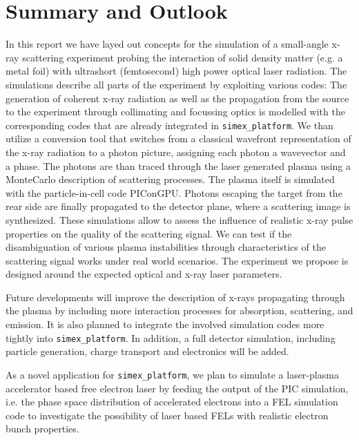 \documentclass[12pt]{scrartcl}
\begin{document}
\section{Summary and Outlook}
In this report we have layed out concepts for the simulation of a small-angle
x-ray scattering experiment probing the interaction of solid density matter
(e.g. a metal foil) with ultrashort (femtosecond) high power optical laser
radiation. The simulations describe all parts of the experiment by exploiting
various codes: The generation of coherent x-ray radiation as well as the
propagation from the source to the experiment through collimating and focussing
optics is modelled with the corresponding codes that are already integrated in
\texttt{simex\_platform}. We than utilize a conversion tool that switches from a
classical wavefront representation of the x-ray radiation to a photon picture,
assigning each photon a wavevector and a phase. The photons are than traced
through the laser generated plasma using a MonteCarlo description of scattering
processes. The plasma itself
is simulated with the particle-in-cell code PIConGPU. Photons
escaping the target from the rear side are finally propagated to the detector
plane, where a scattering image is synthesized. These simulations allow to
assess the influence of realistic x-ray pulse properties on the quality of the
scattering signal. We can test if the disambiguation of various plasma
instabilities through characteristics of the scattering signal works under real
world scenarios.
The experiment we propose is designed around the expected optical and x-ray
laser parameters.

Future developments will improve the description of x-rays propagating through
the plasma by including more interaction processes for absorption, scattering,
and emission. It is also planned to integrate the involved simulation codes more
tightly into \texttt{simex\_platform}. In addition, a full detector simulation,
including particle generation, charge transport and electronics will be added.

As a novel application for \texttt{simex\_platform}, we plan to simulate a
laser-plasma accelerator based free electron laser by feeding the output of the
PIC simulation, i.e. the phase space distribution of accelerated electrons into
a FEL simulation code to investigate the possibility of laser based FELs with
realistic electron bunch properties.

\printbibliography[]
\end{document}
